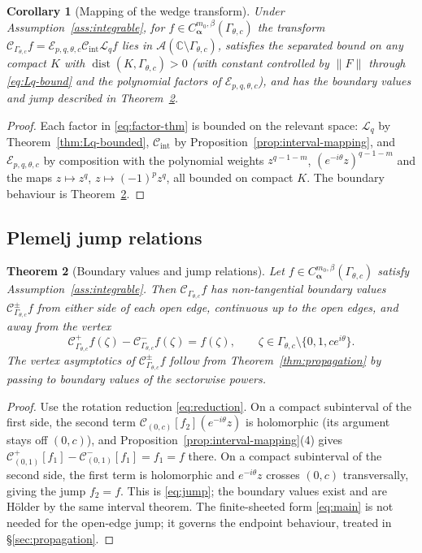 \documentclass[pdflatex,sn-mathphys-num]{sn-jnl}%
\newcommand{\C}{\mathbb{C}}
\newcommand{\Cau}{\mathcal{C}}
\newcommand{\Gw}{\Gamma_{\theta,c}}
\newcommand{\dist}{\operatorname{dist}}
\newcommand{\bd}{\boldsymbol}
\newcommand{\Lq}{\mathcal{L}_{q}}
\newcommand{\Cint}{\mathcal{C}_{\mathrm{int}}}
\newcommand{\Eop}{\mathcal{E}_{p,q,\theta,c}}
\newcommand{\Ahol}{\mathcal{A}}
\theoremstyle{thmstyleone}
\newtheorem{theorem}{Theorem}
\theoremstyle{thmstyletwo}
\newtheorem{corollary}[theorem]{Corollary}
\theoremstyle{thmstylethree}
\begin{document}
\begin{corollary}[Mapping of the wedge transform]\label{cor:wedge-mapping}
Under Assumption~\ref{ass:integrable}, for $f\in C^{m_0,\beta}_{\bd\alpha}(\Gw)$
the transform $\Cau_{\Gw}f=\Eop\Cint\Lq f$ lies in $\Ahol(\C\setminus\Gw)$,
satisfies the separated bound on any compact $K$ with $\dist(K,\Gw)>0$ (with
constant controlled by $\|F\|$ through \eqref{eq:Lq-bound} and the polynomial
factors of $\Eop$), and has the boundary values and jump described in
Theorem~\ref{thm:plemelj}.
\end{corollary}

\begin{proof}
Each factor in \eqref{eq:factor-thm} is bounded on the relevant space:
$\Lq$ by Theorem~\ref{thm:Lq-bounded}, $\Cint$ by
Proposition~\ref{prop:interval-mapping}, and $\Eop$ by composition with the
polynomial weights $z^{q-1-m}$, $(e^{-i\theta}z)^{q-1-m}$ and the maps
$z\mapsto z^{q}$, $z\mapsto(-1)^{p}z^{q}$, all bounded on compact $K$. The
boundary behaviour is Theorem~\ref{thm:plemelj}.
\end{proof}

\subsection{Plemelj jump relations}

\begin{theorem}[Boundary values and jump relations]\label{thm:plemelj}
Let $f\in C^{m_0,\beta}_{\bd\alpha}(\Gw)$ satisfy
Assumption~\ref{ass:integrable}. Then $\Cau_{\Gw}f$ has non-tangential boundary
values $\Cau_{\Gw}^{\pm}f$ from either side of each open edge, continuous up to
the open edges, and away from the vertex
\begin{equation}\label{eq:jump}
  \Cau_{\Gw}^{+}f(\zeta)-\Cau_{\Gw}^{-}f(\zeta)=f(\zeta),
  \qquad \zeta\in\Gw\setminus\{0,1,ce^{i\theta}\}.
\end{equation}
The vertex asymptotics of $\Cau_{\Gw}^{\pm}f$ follow from
Theorem~\ref{thm:propagation} by passing to boundary values of the sectorwise
powers.
\end{theorem}

\begin{proof}
Use the rotation reduction \eqref{eq:reduction}. On a compact subinterval of the
first side, the second term $\Cau_{(0,c)}[f_2](e^{-i\theta}z)$ is holomorphic
(its argument stays off $(0,c)$), and
Proposition~\ref{prop:interval-mapping}(4) gives
$\Cau_{(0,1)}^{+}[f_1]-\Cau_{(0,1)}^{-}[f_1]=f_1=f$ there. On a compact
subinterval of the second side, the first term is holomorphic and
$e^{-i\theta}z$ crosses $(0,c)$ transversally, giving the jump $f_2=f$. This is
\eqref{eq:jump}; the boundary values exist and are H\"older by the same interval
theorem. The finite-sheeted form \eqref{eq:main} is not needed for the
open-edge jump; it governs the endpoint behaviour, treated in
\S\ref{sec:propagation}.
\end{proof}
\end{document}
